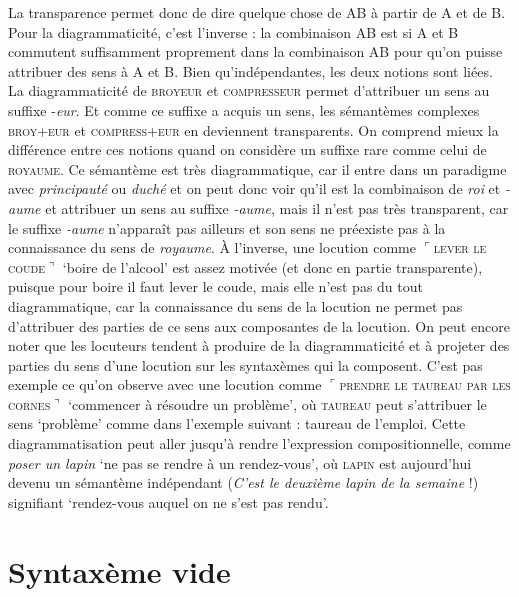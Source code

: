 La transparence permet donc de dire quelque chose de AB à partir de A et de B. Pour la diagrammaticité, c'est l'inverse : la combinaison AB est  si A et B commutent suffisamment proprement dans la combinaison AB pour qu’on puisse attribuer des sens à A et B. Bien qu’indépendantes, les deux notions sont liées. La diagrammaticité de \textsc{broyeur} et \textsc{compresseur} permet d’attribuer un sens au suffixe -\textit{eur}. Et comme ce suffixe a acquis un sens, les sémantèmes complexes \textsc{broy+eur} et \textsc{compress+eur} en deviennent transparents. On comprend mieux la différence entre ces notions quand on considère un suffixe rare comme celui de \textsc{royaume}. Ce sémantème est très diagrammatique, car il entre dans un paradigme avec \textit{principauté} ou \textit{duché} et on peut donc voir qu’il est la combinaison de \textit{roi} et \textit{{}-aume} et attribuer un sens au suffixe \textit{{}-aume}, mais il n’est pas très transparent, car le suffixe \textit{{}-aume} n’apparaît pas ailleurs et son sens ne préexiste pas à la connaissance du sens de \textit{royaume}. À l’inverse, une locution comme $⌜$\textsc{lever} \textsc{le} \textsc{coude}$⌝$ ‘boire de l’alcool’ est assez motivée (et donc en partie transparente), puisque pour boire il faut lever le coude, mais elle n’est pas du tout diagrammatique, car la connaissance du sens de la locution ne permet pas d’attribuer des parties de ce sens aux composantes de la locution. On peut encore noter que les locuteurs tendent à produire de la diagrammaticité et à projeter des parties du sens d’une locution sur les syntaxèmes qui la composent. C’est pas exemple ce qu’on observe avec une locution comme $⌜$\textsc{prendre} \textsc{le} \textsc{taureau} \textsc{par} \textsc{les} \textsc{cornes}$⌝$ ‘commencer à résoudre un problème’, où \textsc{taureau} peut s’attribuer le sens ‘problème’ comme dans l’exemple suivant :  taureau de l’emploi. Cette diagrammatisation peut aller jusqu’à rendre l’expression compositionnelle, comme \textit{poser un lapin} ‘ne pas se rendre à un rendez-vous’, où \textsc{lapin} est aujourd’hui devenu un sémantème indépendant (\textit{C’est le deuxième lapin de la semaine} !) signifiant  ‘rendez-vous auquel on ne s'est pas rendu’.

\section{Syntaxème vide}\label{sec:2.3.3}

